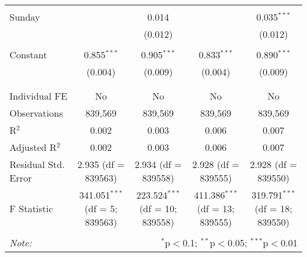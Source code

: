 \documentclass[
]{article}
\begin{document}
\begin{table}[!htbp]
{\begin{tabular}{@{\extracolsep{5pt}}lcccc}
  & & & & \\ 
 Sunday &  & 0.014 &  & 0.035$^{***}$ \\ 
  &  & (0.012) &  & (0.012) \\ 
  & & & & \\ 
 Constant & 0.855$^{***}$ & 0.905$^{***}$ & 0.833$^{***}$ & 0.890$^{***}$ \\ 
  & (0.004) & (0.009) & (0.004) & (0.009) \\ 
  & & & & \\ 
\hline \\[-1.8ex] 
Individual FE & No & No & No & No \\ 
Observations & 839,569 & 839,569 & 839,569 & 839,569 \\ 
R$^{2}$ & 0.002 & 0.003 & 0.006 & 0.007 \\ 
Adjusted R$^{2}$ & 0.002 & 0.003 & 0.006 & 0.007 \\ 
Residual Std. Error & 2.935 (df = 839563) & 2.934 (df = 839558) & 2.928 (df = 839555) & 2.928 (df = 839550) \\ 
F Statistic & 341.051$^{***}$ (df = 5; 839563) & 223.524$^{***}$ (df = 10; 839558) & 411.386$^{***}$ (df = 13; 839555) & 319.791$^{***}$ (df = 18; 839550) \\ 
\hline 
\hline \\[-1.8ex] 
\textit{Note:}  & \multicolumn{4}{r}{$^{*}$p$<$0.1; $^{**}$p$<$0.05; $^{***}$p$<$0.01} \\ 
\end{tabular}
} 
\end{table} 
\newpage
\end{document}
